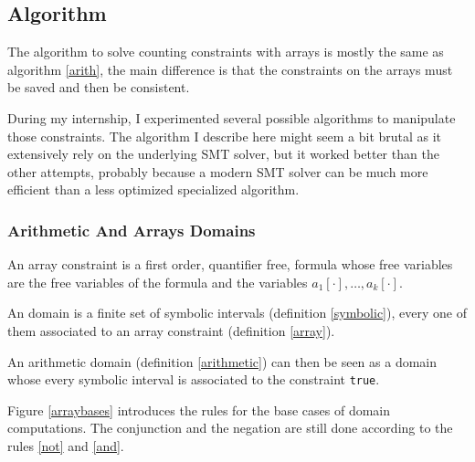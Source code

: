 \documentclass[]{article}
\begin{document}
{\subsection{Algorithm}\label{algorithm}

The algorithm to solve counting constraints with arrays is mostly the
same as algorithm \ref{arith}, the main difference is that the
constraints on the arrays must be saved and then be consistent.

During my internship, I experimented several possible algorithms to
manipulate those constraints. The algorithm I describe here might seem a
bit brutal as it extensively rely on the underlying SMT solver, but it
worked better than the other attempts, probably because a modern SMT
solver can be much more efficient than a less optimized specialized
algorithm.

\subsubsection{Arithmetic And Arrays
Domains}\label{arithmetic-and-arrays-domains}

\begin{definition}

An array constraint is a first order, quantifier free, formula whose
free variables are the free variables of the formula and the variables
$a_1[\cdot], \ldots, a_k[\cdot]$.

\label{array}

\end{definition}

\vspace{3mm}

\begin{definition}[Domain]

An domain is a finite set of symbolic intervals (definition
\ref{symbolic}), every one of them associated to an array constraint
(definition \ref{array}).

\label{domain}

\end{definition}

An arithmetic domain (definition \ref{arithmetic}) can then be seen as a
domain whose every symbolic interval is associated to the constraint
\texttt{true}.

Figure \ref{arraybases} introduces the rules for the base cases of
domain computations. The conjunction and the negation are still done
according to the rules \ref{not} and \ref{and}.

}
\end{document}
